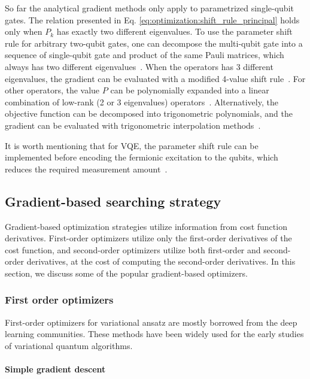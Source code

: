 So far the analytical gradient methods only apply to parametrized single-qubit gates. The relation presented in Eq. \ref{eq:optimization:shift_rule_principal} holds only when $P_k$ has exactly two different eigenvalues. To use the parameter shift rule for arbitrary two-qubit gates, one can decompose the multi-qubit gate into a sequence of single-qubit gate and product of the same Pauli matrices, which always has two different eigenvalues~\cite{crooks_gradients_2019}. When the operators has 3 different eigenvalues, the gradient can be evaluated with a modified 4-value shift rule~\cite{izmaylov_analytic_2021}. For other operators, the value $P$ can be polynomially expanded into a linear combination of low-rank (2 or 3 eigenvalues) operators~\cite{izmaylov_analytic_2021}. Alternatively, the objective function can be decomposed into trigonometric polynomials, and the gradient can be evaluated with trigonometric interpolation methods~\cite{GeneralGradientsWierichs2022,OptimalityCircuits2021Theis}.

It is worth mentioning that for VQE, the parameter shift rule can be implemented before encoding the fermionic excitation to the qubits, which reduces the required measurement amount~\cite{Kottmann2021_3}.

\subsection{Gradient-based searching strategy}

Gradient-based optimization strategies utilize information from cost function derivatives. First-order optimizers utilize only the first-order derivatives of the cost function, and second-order optimizers utilize both first-order and second-order derivatives, at the cost of computing the second-order derivatives. In this section, we discuss some of the popular gradient-based optimizers.

\subsubsection{First order optimizers}

First-order optimizers for variational ansatz are mostly borrowed from the deep learning communities. These methods have been widely used for the early studies of variational quantum algorithms.


\paragraph{Simple gradient descent}

